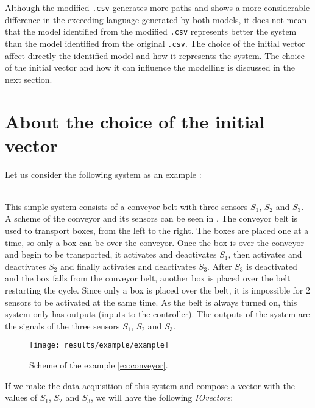 Although the modified \verb|.csv| generates more paths and shows a more
considerable difference in the exceeding language generated by both models, it
does not mean that the model identified from the modified \verb|.csv| represents better the
system than the model identified from the original \verb|.csv|.
The choice of the initial vector affect directly the identified
model and how it represents the system. The choice of the initial vector and how
it can influence the modelling is discussed in the
next section.
\newpage

\section{About the choice of the initial vector}
 Let us consider the following system as an example : 
\begin{example}~\\
  \label{ex:conveyor}
 This simple system consists of a conveyor belt with three sensors $S_1$, $S_2$ and
 $S_3$. A scheme of the conveyor and its sensors can be seen in
 . The conveyor belt is used to transport boxes, from
 the left to the right. The boxes are placed one at a time, so only a box can be
 over the conveyor. Once the box is over
 the conveyor and begin to be transported, it activates and deactivates $S_1$,
 then activates and deactivates $S_2$ and
 finally activates and deactivates $S_3$. After $S_3$ is deactivated and the box
 falls from the conveyor belt, another
 box is placed over the
 belt restarting the cycle. Since only a box is placed over the belt,
 it is impossible for 2 sensors to be activated at the same time.  As the belt is always turned on, this system
 only has outputs (inputs to the controller). The outputs of the system are the signals of the three sensors $S_1$, $S_2$ and
 $S_3$.
\end{example}
\begin{figure}[H]
  \centering
  \texttt{[image: results/example/example]}
  \caption{Scheme of the example \ref{ex:conveyor}.}
    \label{fig:schemeExConveyor}
\end{figure}
If we make the data acquisition of this system and compose a vector with the
values of $S_1$, $S_2$ and $S_3$, we will have the following \emph{IOvectors}:
